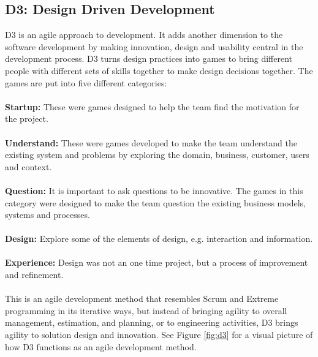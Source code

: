 \subsection{D3: Design Driven Development}
D3 is an agile approach to development. It adds another dimension to the software development by making innovation, design and usability central in the development process. D3 turns design practices into games to bring different people with different sets of skills together to make design decisions together\cite{designdriven3}. The games are put into five different categories\cite{designdriven2}:\\
\\
\textbf{Startup:} These were games designed to help the team find the motivation for the project.\\
\\
\textbf{Understand:} These were games developed to make the team understand the existing system and problems by exploring the domain, business, customer, users and context.\\
\\
\textbf{Question:} It is important to ask questions to be innovative. The games in this category were designed to make the team question the existing business models, systems and processes.\\
\\
\textbf{Design:} Explore some of the elements of design, e.g. interaction and information.\\
\\
\textbf{Experience:} Design was not an one time project, but a process of improvement and refinement.\\
\\
This is an agile development method that resembles Scrum and Extreme programming in its iterative ways, but instead of bringing agility to overall management, estimation, and planning, or to engineering activities, D3 brings agility to solution design and innovation\cite{designdriven1}. See Figure \ref{fig:d3} for a visual picture of how D3 functions as an agile development method.\\
\\
